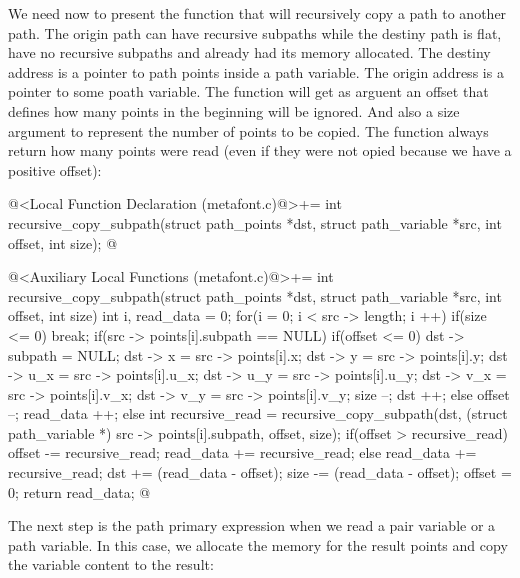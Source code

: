 We need now to present the function that will recursively copy a path
to another path. The origin path can have recursive subpaths while the
destiny path is flat, have no recursive subpaths and already had its
memory allocated. The destiny address is a pointer to path points
inside a path variable. The origin address is a pointer to some poath
variable. The function will get as arguent an offset that defines how
many points in the beginning will be ignored. And also a size argument
to represent the number of points to be copied. The function always
return how many points were read (even if they were not opied because
we have a positive offset):

\iniciocodigo
@<Local Function Declaration (metafont.c)@>+=
int recursive_copy_subpath(struct path_points *dst, struct path_variable *src,
                           int offset, int size);
@
\fimcodigo

\iniciocodigo
@<Auxiliary Local Functions (metafont.c)@>+=
int recursive_copy_subpath(struct path_points *dst, struct path_variable *src,
                           int offset, int size){
  int i, read_data = 0;
  for(i = 0; i < src -> length; i ++){
    if(size <= 0)
      break;
    if(src -> points[i].subpath == NULL){
      if(offset <= 0){
        dst -> subpath = NULL;
        dst -> x = src -> points[i].x;
        dst -> y = src -> points[i].y;
        dst -> u_x = src -> points[i].u_x;
        dst -> u_y = src -> points[i].u_y;
        dst -> v_x = src -> points[i].v_x;
        dst -> v_y = src -> points[i].v_y;
        size --;
        dst ++;
      }
      else
        offset --;
      read_data ++;
    }
    else{
      int recursive_read = recursive_copy_subpath(dst, (struct path_variable *)
                                                       src -> points[i].subpath,
                                                  offset, size);
      if(offset > recursive_read){
        offset -= recursive_read;
        read_data += recursive_read;
      }
      else{
        read_data += recursive_read;
        dst += (read_data - offset);
        size -= (read_data - offset);
        offset = 0;
      }
    }
  }
  return read_data;
}
@
\fimcodigo

The next step is the path primary expression when we read a pair
variable or a path variable. In this case, we allocate the memory for
the result points and copy the variable content to the result:

